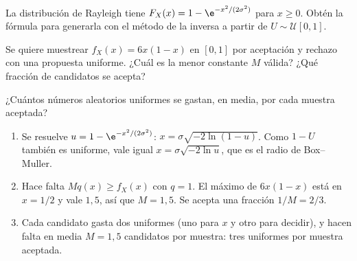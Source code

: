 \documentclass[11pt,a4paper]{scrartcl}
\begin{document}
\begin{ejercicio}
  \begin{incisos}[1]
    \item La distribución de Rayleigh tiene $F_X(x)=1-\e^{-x^2/(2\sigma^2)}$ para $x\ge0$. Obtén la fórmula para generarla con el método de la inversa a partir de $U\sim\mathcal U[0,1]$.
    \item Se quiere muestrear $f_X(x)=6x(1-x)$ en $[0,1]$ por aceptación y rechazo con una propuesta uniforme. ¿Cuál es la menor constante $M$ válida? ¿Qué fracción de candidatos se acepta?
    \item ¿Cuántos números aleatorios uniformes se gastan, en media, por cada muestra aceptada?
  \end{incisos}
\end{ejercicio}
\begin{solucion}
  \begin{enumerate}[label=\alph*)]
    \item Se resuelve $u=1-\e^{-x^2/(2\sigma^2)}$: $x=\sigma\sqrt{-2\ln(1-u)}$. Como $1-U$ también es uniforme, vale igual $x=\sigma\sqrt{-2\ln u}$, que es el radio de Box–Muller.
    \item Hace falta $Mq(x)\ge f_X(x)$ con $q=1$. El máximo de $6x(1-x)$ está en $x=1/2$ y vale $1{,}5$, así que $M=1{,}5$. Se acepta una fracción $1/M=2/3$.
    \item Cada candidato gasta dos uniformes (uno para $x$ y otro para decidir), y hacen falta en media $M=1{,}5$ candidatos por muestra: tres uniformes por muestra aceptada.
  \end{enumerate}
\end{solucion}
\end{document}

